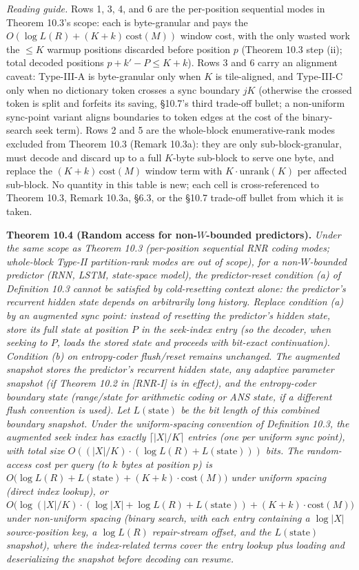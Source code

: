 \documentclass[
]{article}
\begin{document}
\emph{Reading guide.} Rows 1, 3, 4, and 6 are the per-position
sequential modes in Theorem 10.3's scope: each is byte-granular and pays
the $O(\log L(R) + (K\!+\!k)\,\mathrm{cost}(M))$ window cost, with the
only wasted work the $\le K$ warmup positions discarded before position
$p$ (Theorem 10.3 step (ii); total decoded positions $p+k'-P\le K+k$).
Rows 3 and 6 carry an alignment caveat: Type-III-A is byte-granular only
when $K$ is tile-aligned, and Type-III-C only when no dictionary token
crosses a sync boundary $jK$ (otherwise the crossed token is split and
forfeits its saving, §10.7's third trade-off bullet; a non-uniform
sync-point variant aligns boundaries to token edges at the cost of the
binary-search seek term). Rows 2 and 5 are the whole-block
enumerative-rank modes excluded from Theorem 10.3 (Remark 10.3a): they
are only sub-block-granular, must decode and discard up to a full
$K$-byte sub-block to serve one byte, and replace the
$(K\!+\!k)\,\mathrm{cost}(M)$ window term with $K\!\cdot\!\mathrm{unrank}(K)$
per affected sub-block. No quantity in this table is new; each cell is
cross-referenced to Theorem 10.3, Remark 10.3a, §6.3, or the §10.7
trade-off bullet from which it is taken.

\textbf{Theorem 10.4 (Random access for non-$W$-bounded predictors).}
\emph{Under the same scope as Theorem 10.3 (per-position sequential
RNR coding modes; whole-block Type-II partition-rank modes are out
of scope), for a non-$W$-bounded predictor (RNN, LSTM, state-space
model), the predictor-reset condition (a) of Definition 10.3 cannot
be satisfied by cold-resetting context alone: the predictor's
recurrent hidden state depends on arbitrarily long history. Replace
condition (a) by an \emph{augmented sync point}: instead of
resetting the predictor's hidden state, store its full state at
position $P$ in the seek-index entry (so the decoder, when seeking
to $P$, loads the stored state and proceeds with bit-exact
continuation). Condition (b) on entropy-coder flush/reset remains
unchanged. The augmented snapshot stores the predictor's recurrent
hidden state, any adaptive parameter snapshot (if Theorem 10.2 in [RNR-I] is
in effect), and the entropy-coder boundary state (range/state for
arithmetic coding or ANS state, if a different flush convention is
used). Let $L(\text{state})$ be the bit length of this combined
boundary snapshot. Under the uniform-spacing convention of
Definition 10.3, the augmented seek index has exactly
$\lceil |X|/K \rceil$ entries (one per uniform sync point), with
total size $O((|X|/K) \cdot (\log L(R) + L(\text{state})))$ bits.
The random-access cost per query (to $k$ bytes at position $p$) is
$O\bigl(\log L(R) + L(\text{state}) + (K + k) \cdot
\mathrm{cost}(M)\bigr)$ under uniform spacing (direct index lookup),
or $O\bigl(\log(|X|/K) \cdot (\log |X| + \log L(R) + L(\text{state})) + (K + k)
\cdot \mathrm{cost}(M)\bigr)$ under non-uniform spacing (binary
search, with each entry containing a $\log |X|$ source-position
key, a $\log L(R)$ repair-stream offset, and the $L(\text{state})$
snapshot), where the index-related terms cover the entry lookup
plus loading and deserializing the snapshot before decoding can
resume.}
\end{document}
